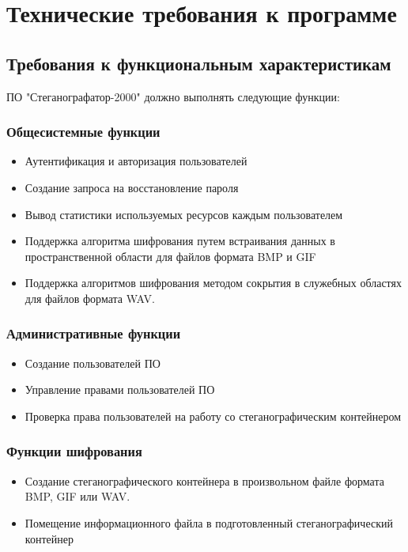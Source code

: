 \section{Технические требования к программе}

\subsection{Требования к функциональным характеристикам}

ПО "Стеганографатор-2000" должно выполнять следующие функции:


\subsubsection{Общесистемные функции}
\begin{itemize}
	\item Аутентификация и авторизация пользователей
	\item Создание запроса на восстановление пароля
	\item Вывод статистики используемых ресурсов каждым пользователем
	\item Поддержка алгоритма шифрования путем встраивания данных в пространственной области для файлов формата BMP и GIF
	\item Поддержка алгоритмов шифрования методом сокрытия в служебных областях для файлов формата WAV.
\end{itemize}

\subsubsection{Административные функции}
\begin{itemize}
	\item Создание пользователей ПО
	\item Управление правами пользователей ПО
	\item Проверка права пользователей на работу со стеганографическим контейнером
\end{itemize}

\subsubsection{Функции шифрования}
\begin{itemize}
\item Создание стеганографического контейнера в произвольном файле формата BMP, GIF или WAV.
\item Помещение информационного файла в подготовленный стеганографический контейнер
\end{itemize}

